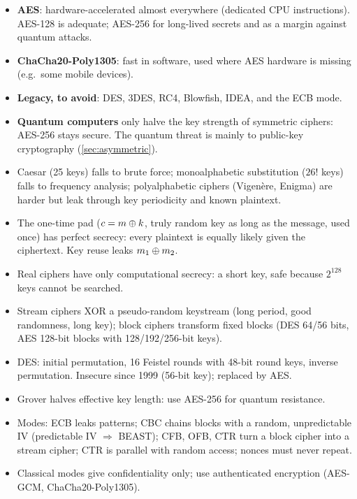 \begin{itemize}
    \item \textbf{AES}: hardware-accelerated almost everywhere (dedicated CPU instructions). AES-128 is adequate; AES-256 for long-lived secrets and as a margin against quantum attacks.
    \item \textbf{ChaCha20-Poly1305}: fast in software, used where AES hardware is missing (e.g.\ some mobile devices).
    \item \textbf{Legacy, to avoid}: DES, 3DES, RC4, Blowfish, IDEA, and the ECB mode.
    \item \textbf{Quantum computers} only halve the key strength of symmetric ciphers: AES-256 stays secure. The quantum threat is mainly to public-key cryptography (\cref{sec:asymmetric}).
\end{itemize}

\begin{summary}
\begin{itemize}
    \item Caesar (25 keys) falls to brute force; monoalphabetic substitution ($26!$ keys) falls to frequency analysis; polyalphabetic ciphers (Vigenère, Enigma) are harder but leak through key periodicity and known plaintext.
    \item The one-time pad ($c = m \oplus k$, truly random key as long as the message, used once) has perfect secrecy: every plaintext is equally likely given the ciphertext. Key reuse leaks $m_1 \oplus m_2$.
    \item Real ciphers have only computational secrecy: a short key, safe because $2^{128}$ keys cannot be searched.
    \item Stream ciphers XOR a pseudo-random keystream (long period, good randomness, long key); block ciphers transform fixed blocks (DES 64/56 bits, AES 128-bit blocks with 128/192/256-bit keys).
    \item DES: initial permutation, 16 Feistel rounds with 48-bit round keys, inverse permutation. Insecure since 1999 (56-bit key); replaced by AES.
    \item Grover halves effective key length: use AES-256 for quantum resistance.
    \item Modes: ECB leaks patterns; CBC chains blocks with a random, unpredictable IV (predictable IV $\Rightarrow$ BEAST); CFB, OFB, CTR turn a block cipher into a stream cipher; CTR is parallel with random access; nonces must never repeat.
    \item Classical modes give confidentiality only; use authenticated encryption (AES-GCM, ChaCha20-Poly1305).
\end{itemize}
\end{summary}

